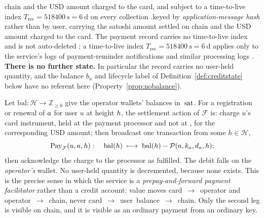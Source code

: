 \begin{definition}
{chain and the USD amount charged to the card, and subject to a time-to-live index
$T_{\mathrm{rec}} = \qty{518400}{\second} = \qty{6}{\day}$ on every collection
.}{keyed by \emph{application-message hash} rather than by user, carrying the satoshi amount settled on
chain and the USD amount charged to the card. The payment record carries no time-to-live index and is
not auto-deleted ; a time-to-live index
$T_{\mathrm{rec}} = \qty{518400}{\second} = \qty{6}{\day}$ applies only to the service's logs of
payment-reminder notifications and similar processing logs
.} \textbf{There is no further
state.} In particular the record carries no user-held quantity, and the balance $b_u$ and lifecycle
label of Definition~\ref{def:creditstate} below have no referent here
(Property~\ref{prop:nobalance}).
\end{definition}

\begin{definition}
\label{def:prepayforward}
Let $\mathrm{bal} : \mathcal{H} \to \mathbb{Z}_{\ge 0}$ give the operator wallets' balances in
$\,\mathrm{sat}$. For a registration or renewal of $a$ for user $u$ at height $h$, the settlement action
of $\mathcal{F}$ is: charge $u$'s card instrument, held at the payment processor and not at \Flux,
for the corresponding USD amount; then broadcast one transaction from some $h \in \mathcal{H}$,
\[
\mathrm{Pay}_{\mathcal{F}}(u,a,h):\quad
\mathrm{bal}(h) \;\longmapsto\; \mathrm{bal}(h) - \mathcal{P}(a,k_{a},d_{a},h);
\]
then acknowledge the charge to the processor as fulfilled. The debit falls on the \emph{operator's}
wallet. No user-held quantity is decremented, because none exists. This is the precise sense in
which the service is a \emph{prepay-and-forward payment facilitator} rather than a credit
account: value moves card~$\to$~operator and operator~$\to$~chain, never
card~$\to$~user~balance~$\to$~chain. Only the second leg is visible on chain, and it is visible as an
ordinary payment from an ordinary key.
\end{definition}

